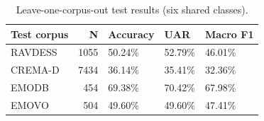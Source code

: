 \begin{table}
\caption{Leave-one-corpus-out test results (six shared classes).}
\label{tab:wavlm_baseline_loco}
\begin{tabular}{lrlll}
\toprule
Test corpus & N & Accuracy & UAR & Macro F1 \\
\midrule
RAVDESS & 1055 & 50.24\% & 52.79\% & 46.01\% \\
CREMA-D & 7434 & 36.14\% & 35.41\% & 32.36\% \\
EMODB & 454 & 69.38\% & 70.42\% & 67.98\% \\
EMOVO & 504 & 49.60\% & 49.60\% & 47.41\% \\
\bottomrule
\end{tabular}
\end{table}
